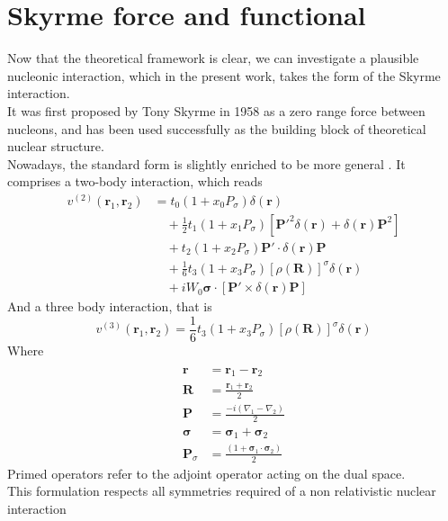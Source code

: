 \section{Skyrme force and functional}
Now that the theoretical framework is clear, we can investigate a plausible nucleonic interaction, which in the present work, takes the form of the Skyrme interaction.
\\It was first proposed by Tony Skyrme in 1958 \cite{SKYRME1958615} as a zero range force between nucleons, and has been used successfully as the building block of theoretical nuclear structure.
\\Nowadays, the standard form is slightly enriched to be more general \cite{CHABANAT1997710}. It comprises a two-body interaction, which reads
\begin{align*}
v^{(2)}(\mathbf{r}_1, \mathbf{r}_2) &= t_0 \left(1 + x_0 P_\sigma \right) \delta(\mathbf{r}) \\
&\quad + \frac{1}{2} t_1 \left(1 + x_1 P_\sigma \right) \left[ \mathbf{P}'^2 \delta(\mathbf{r}) + \delta(\mathbf{r}) \mathbf{P}^2 \right] \\
&\quad + t_2 \left(1 + x_2 P_\sigma \right) \mathbf{P}' \cdot \delta(\mathbf{r}) \mathbf{P} \\
&\quad + \frac{1}{6} t_3 \left(1 + x_3 P_\sigma \right) \left[ \rho(\mathbf{R}) \right]^\sigma \delta(\mathbf{r}) \\
&\quad + i W_0 \boldsymbol{\sigma}\cdot \left[ \mathbf{P}' \times \delta(\mathbf{r}) \mathbf{P} \right]
\end{align*}
And a three body interaction, that is
\begin{equation*}
v^{(3)}(\mathbf r_1, \mathbf r_2)=\frac 1 6 t_3 \left(1 + x_3 P_\sigma \right) \left[ \rho(\mathbf{R}) \right]^\sigma \delta(\mathbf{r}) 
\end{equation*}
Where 
\begin{align*}
\\\mathbf{r} &= \mathbf{r}_1 - \mathbf{r}_2
\\\mathbf{R} &= \frac{\mathbf{r}_1+\mathbf{r}_2}{2}
\\\mathbf{P} &= \frac{-i(\nabla_1 - \nabla_2)}{2}
\\\boldsymbol{\sigma} &= \boldsymbol{\sigma}_1 + \boldsymbol{\sigma}_2
\\\mathbf{P}_\sigma &= \frac{(1+\boldsymbol{\sigma}_1\cdot\boldsymbol{\sigma}_2)}{2}
\end{align*}
Primed operators refer to the adjoint operator acting on the dual space.
\\This formulation respects all symmetries required of a non relativistic nuclear interaction 
